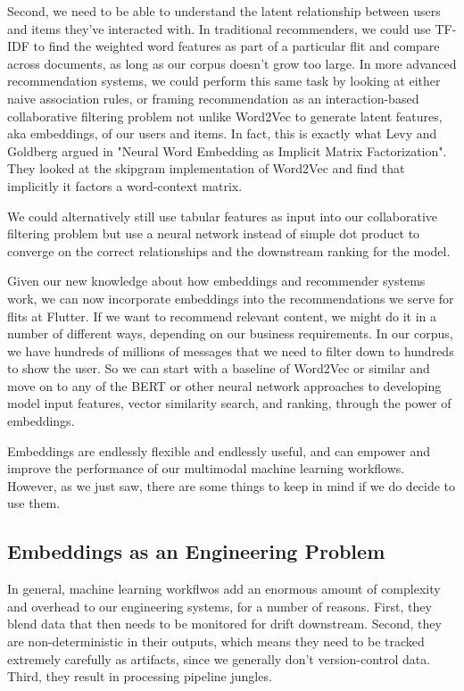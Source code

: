 \documentclass[11pt, table]{diazessay} %
\begin{document}
\begin{sloppypar}
Second, we need to be able to understand the latent relationship between users and items they've interacted with. In traditional recommenders, we could use TF-IDF to find the weighted word features as part of a particular flit and compare across documents, as long as our corpus doesn't grow too large. In more advanced recommendation systems, we could perform this same task by looking at either naive association rules, or framing recommendation as an interaction-based collaborative filtering problem not unlike Word2Vec to generate latent features, aka embeddings, of our users and items. In fact, this is exactly what Levy and Goldberg argued in "Neural Word Embedding as Implicit Matrix Factorization"\citep{levy2014neural}. They looked at the skipgram implementation of Word2Vec and find that implicitly it factors a word-context matrix.

We could alternatively still use tabular features as input into our collaborative filtering problem but use a neural network\citep{he2017neural} instead of simple dot product to converge on the correct relationships and the downstream ranking for the model. 

Given our new knowledge about how embeddings and recommender systems work, we can now incorporate embeddings into the recommendations we serve for flits at Flutter.  If we want to recommend relevant content, we might do it in a number of different ways, depending on our business requirements.  In our corpus, we have hundreds of millions of messages that we need to filter down to hundreds to show the user. So we can start with a baseline of Word2Vec or similar and move on to any of the BERT or other neural network approaches to developing model input features, vector similarity search, and ranking, through the power of embeddings. 

Embeddings are endlessly flexible and endlessly useful, and can empower and improve the performance of our multimodal machine learning workflows. However, as we just saw, there are some things to keep in mind if we do decide to use them.

\subsection{Embeddings as an Engineering Problem}

In general, machine learning workflwos add an enormous amount of complexity and overhead to our engineering systems, for a number of reasons\citep{sculley2014machine}. First, they blend data that then needs to be monitored for drift downstream. Second, they are non-deterministic in their outputs, which means they need to be tracked extremely carefully as artifacts, since we generally don't version-control data. Third, they result in processing pipeline jungles. 



\end{sloppypar}
\end{document}
